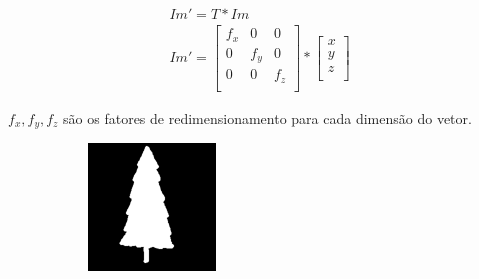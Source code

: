 \documentclass[
	article,			%
	11pt,				%
	oneside,			%
	a4paper,			%
	english,			%
	brazil,				%
	sumario=tradicional
	]{abntex2}
\begin{document}
\begin{align}
Im'=T*Im\\
 Im' = 
\begin{bmatrix}
f_x & 0 & 0  \\
0 & f_y & 0  \\
0 & 0 & f_z  \\
\end{bmatrix}*
\begin{bmatrix}
x\\
y\\
z\\
\end{bmatrix}
\end{align}

$f_x,f_y,f_z$ são os fatores de redimensionamento para cada dimensão do vetor.

\begin{figure}
		\centering
        \begin{subfigure}[b]{0.3\textwidth}
                \includegraphics[width=\textwidth,scale=1]{imagens/ex1/imageScale1.png}
                \caption{}
                \label{fig:RedOriginal}
        \end{subfigure}%
        ~ %
        \begin{subfigure}[b]{0.3\textwidth}

\end{subfigure}
\end{figure}
\end{document}
